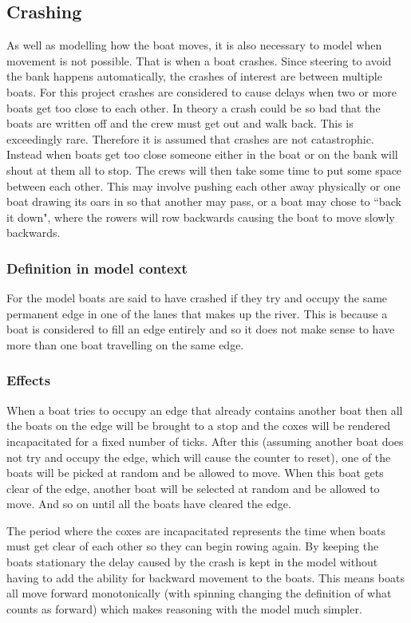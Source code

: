       \subsection{Crashing}\label{model:movement:crashing}
      As well as modelling how the boat moves, it is also necessary to model when movement is not possible. That is when a boat crashes. Since steering to avoid the bank happens automatically, the crashes of interest are between multiple boats. For this project crashes are considered to cause delays when two or more boats get too close to each other. In theory a crash could be so bad that the boats are written off and the crew must get out and walk back. This is exceedingly rare. Therefore it is assumed that crashes are not catastrophic. Instead when boats get too close someone either in the boat or on the bank will shout at them all to stop. The crews will then take some time to put some space between each other. This may involve pushing each other away physically or one boat drawing its oars in so that another may pass, or a boat may chose to ``back it down", where the rowers will row backwards causing the boat to move slowly backwards.
        
      \subsubsection{Definition in model context}
      For the model boats are said to have crashed if they try and occupy the same permanent edge in one of the lanes that makes up the river. This is because a boat is considered to fill an edge entirely and so it does not make sense to have more than one boat travelling on the same edge.

      \subsubsection{Effects}
      When a boat tries to occupy an edge that already contains another boat then all the boats on the edge will be brought to a stop and the coxes will be rendered incapacitated for a fixed number of ticks. After this (assuming another boat does not try and occupy the edge, which will cause the counter to reset), one of the boats will be picked at random and be allowed to move. When this boat gets clear of the edge, another boat will be selected at random and be allowed to move. And so on until all the boats have cleared the edge.
      
      The period where the coxes are incapacitated represents the time when boats must get clear of each other so they can begin rowing again. By keeping the boats stationary the delay caused by the crash is kept in the model without having to add the ability for backward movement to the boats. This means boats all move forward monotonically (with spinning changing the definition of what counts as forward) which makes reasoning with the model much simpler.
      
